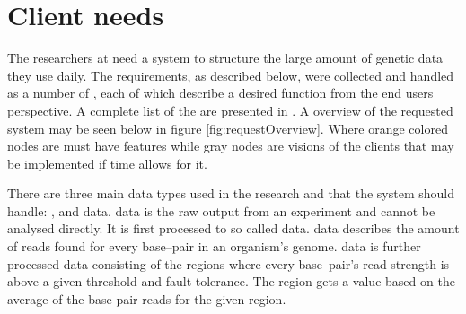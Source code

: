 \section{Client needs}
The researchers at  need a system to structure the large amount of genetic data they use daily. The requirements, as described below, were collected and handled as a number of , each of which describe a desired function from the end users perspective. A complete list of the  are presented in . %
A overview of the requested system may be seen below in figure \ref{fig:requestOverview}. Where orange colored nodes are must have features while gray nodes are visions of the clients that may be implemented if time allows for it.

There are three main data types used in the research and that the system should handle: ,  and  data.  data is the raw output from an experiment and cannot be analysed directly. It is first processed to so called  data.  data describes the amount of reads found for every base--pair in an organism's genome.  data is further processed  data consisting of the regions where every base--pair's read strength is above a given threshold and fault tolerance. The region gets a value based on the average of the base-pair reads for the given region.

